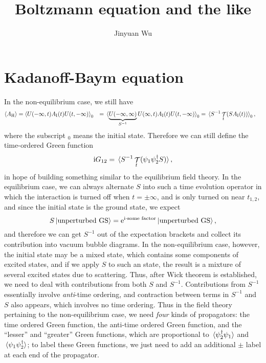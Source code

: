 \documentclass[hyperref, a4paper]{article}
\title{Boltzmann equation and the like}
\author{Jinyuan Wu}
\DeclareMathOperator{\timeorder}{\mathcal{T}}
\newcommand*{\ii}{\mathrm{i}}
\newcommand*{\ee}{\mathrm{e}}
\def\\{}%
\begin{document}
\maketitle

\section{Kadanoff-Baym equation}

In the non-equilibrium case, 
we still have 
\begin{equation}
    \begin{aligned}
        \expval{A_{\text{H}}} &= \expval{  U(-\infty, t) A_{\text{I}}(t) U(t, -\infty) }_{0} \\
        &= \expval*{  \underbrace{U(-\infty, \infty)}_{S^{-1}} U(\infty, t) A_{\text{I}}(t) U(t, -\infty) }_0 \\
        &= \expval*{S^{-1} \timeorder_t ( S A_{\text{I}}(t) )}_0,
    \end{aligned}
\end{equation}
where the subscript $_0$ means the initial state.
Therefore we can still define the time-ordered Green function 
\begin{equation}
    \ii G_{12} = \expval*{S^{-1} \timeorder_t (\psi_1 \psi_2^\dagger S) },
\end{equation}
in hope of building something similar to the equilibrium field theory.
In the equilibrium case, 
we can always alternate $S$ into such a time evolution operator 
in which the interaction is turned off when $t = \pm \infty$,
and is only turned on near $t_{1,2}$,
and since the initial state is the ground state, 
we expect 
\begin{equation}
    S \ket*{\text{unperturbed GS}} = \ee^{\ii \cdot \text{some factor}} \ket*{\text{unperturbed GS}},
\end{equation}
and therefore we can get $S^{-1}$ out of the expectation brackets 
and collect its contribution into vacuum bubble diagrams.
In the non-equilibrium case, however,
the initial state may be a mixed state, 
which contains some components of excited states, 
and if we apply $S$ to such an state, 
the result is a mixture of several excited states 
due to scattering.
Thus, after Wick theorem is established, 
we need to deal with contributions from both $S$ and $S^{-1}$.
Contributions from $S^{-1}$ essentially involve 
\emph{anti}-time ordering,
and contraction between terms in $S^{-1}$ and $S$ also appears, 
which involves no time ordering.
Thus in the field theory pertaining to the non-equilibrium case, 
we need \emph{four} kinds of propagators:
the time ordered Green function, 
the anti-time ordered Green function,
and the ``lesser'' and ``greater'' Green functions,
which are proportional to $\expval*{\psi_2^\dagger \psi_1}$ and $\expval*{\psi_1 \psi_2^\dagger}$;
to label these Green functions, 
we just need to add an additional $\pm$ label 
at each end of the propagator.
\end{document}
